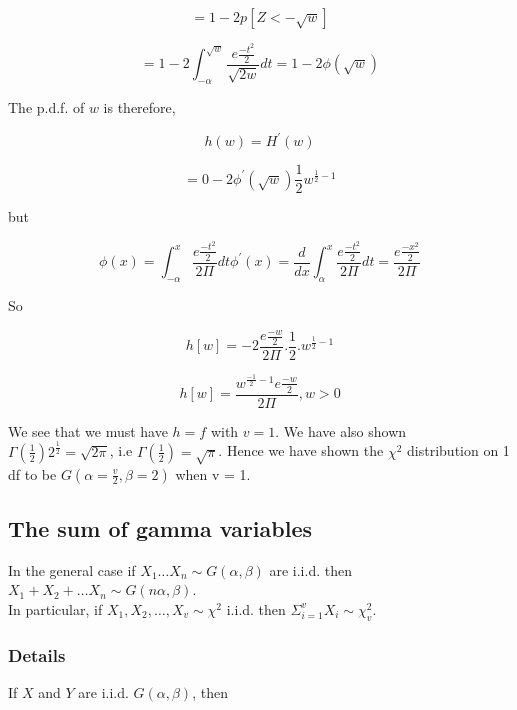 \documentclass[12pt,a4paper]{article}
\theoremstyle{regla}
\theoremstyle{remark}
\theoremstyle{definition}
\theoremstyle{nonumberbreak}
\begin{document}
$$ = 1-2p [Z< - \sqrt{w}]$$

$$ = 1 - 2  \int_{-\alpha}^{\sqrt{w}} \frac{e \frac{-t^2}{2}} {\sqrt{2w}} dt = 1 - 2\phi (\sqrt{w})$$
 

The p.d.f. of $w$ is therefore,

$$h(w) = H ^\prime(w)$$

$$ = 0 - 2\phi ^\prime (\sqrt{w}) \frac{1} {2} w ^ {\frac{1} {2} -1}$$

but 

$$ \phi (x) = \int_{-\alpha}^{x} \frac{e \frac{-t^2}{2}} {2\Pi} dt  \phi ^\prime (x) = \frac {d}{dx}\int_{\alpha}^{x}\frac{e \frac{-t^2}{2}} {2\Pi} dt = \frac{e \frac{-x^2}{2}} {2\Pi}$$

So 

$$ h[w] =  -2 \frac{e \frac{-w}{2}} {2\Pi}. \frac {1} {2} . w^{\frac {1}{2} -1} $$

 

$$ h[w] = \frac{w^ {\frac{-1}{2}-1} e \frac{-w}{2}} {2\Pi}, w > 0$$

We see that we must have $ h=f $ with $v = 1 $. We have also shown $ \Gamma (\frac {1}{2}) 2 ^\frac {1}{2} = \sqrt{2\pi}$, i.e $ \Gamma (\frac {1}{2}) = \sqrt{\pi}$. Hence we have shown the $\chi^2$ distribution on 1 df to be $G (\alpha = \frac {v}{2}, \beta = 2)$  when v = 1.


 


\subsection{The sum of gamma variables}
\begin{fbox}
\begin{minipage}{0.97\textwidth}
In the general case if $ X_1 \ldots X_n \sim G (\alpha, \beta)$ are i.i.d. then $ X_1 + X_2 + \ldots X_n \sim G (n\alpha, \beta)$.\\
 
In particular, if $ X_1, X_2 , \ldots, X_v \sim \chi^2$ i.i.d. then $ \Sigma_{i=1}^v X_i \sim \chi^2_{v}$.

\end{minipage}
\end{fbox}
\subsubsection{Details}
If $X$ and $Y$ are i.i.d. $G (\alpha, \beta)$, then
 
\end{document}
